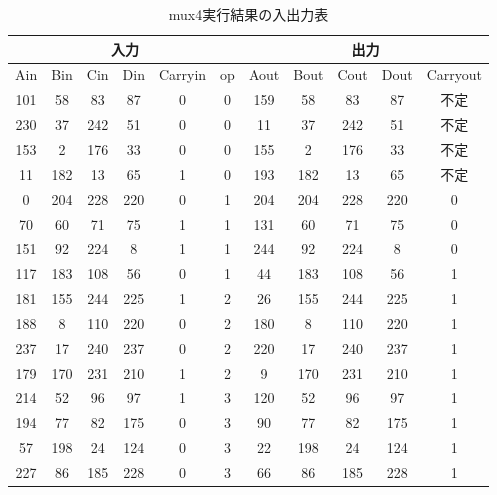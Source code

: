 \documentclass[12pt]{jreport}
\begin{document}
        \begin{table}[H]
            \begin{center}
                \caption{mux4実行結果の入出力表}
                \begin{tabular} {|c|c|c|c|c|c|c|c|c|c|c|} \hline
                    \multicolumn{6}{|c|}{入力} & \multicolumn{5}{|c|}{出力} \\ \hline \hline
                    Ain & Bin & Cin & Din & Carryin & op & Aout & Bout & Cout & Dout & Carryout \\ \hline
                    101 & 58 & 83 & 87 & 0 & 0 & 159 & 58 & 83 & 87 & 不定\\ \hline
                    230 & 37 & 242 & 51 & 0 & 0 & 11 & 37 & 242 & 51 & 不定 \\ \hline
                    153 & 2 & 176 & 33 & 0 & 0 & 155 & 2 & 176 & 33 & 不定 \\ \hline
                    11 & 182 & 13 & 65 & 1 & 0 & 193 & 182 & 13 & 65 & 不定 \\ \hline

                    0 & 204 & 228 & 220 & 0 & 1 & 204 & 204 & 228 & 220 & 0 \\ \hline
                    70 & 60 & 71 & 75 & 1 & 1 & 131 & 60 & 71 & 75 & 0 \\ \hline
                    151 & 92 & 224 & 8 & 1 & 1 & 244 & 92 & 224 & 8 & 0 \\ \hline
                    117 & 183 & 108 & 56 & 0 & 1 & 44 & 183 & 108 & 56 & 1 \\ \hline

                    181 & 155 & 244 & 225 & 1 & 2 & 26 & 155 & 244 & 225 & 1 \\ \hline
                    188 & 8 & 110 & 220 & 0 & 2 & 180 & 8 & 110 & 220 & 1 \\ \hline
                    237 & 17 & 240 & 237 & 0 & 2 & 220 & 17 & 240 & 237 & 1 \\ \hline
                    179 & 170 & 231 & 210 & 1 & 2 & 9 & 170 & 231 & 210 & 1 \\ \hline

                    214 & 52 & 96 & 97 & 1 & 3 & 120 & 52 & 96 & 97 & 1 \\ \hline
                    194 & 77 & 82 & 175 & 0 & 3 & 90 & 77 & 82 & 175 & 1 \\ \hline
                    57 & 198 & 24 & 124 & 0 & 3 & 22 & 198 & 24 & 124 & 1 \\ \hline
                    227 & 86 & 185 & 228 & 0 & 3 & 66 & 86 & 185 & 228 & 1 \\ \hline


\end{tabular}
\end{center}
\end{table}
\end{document}
